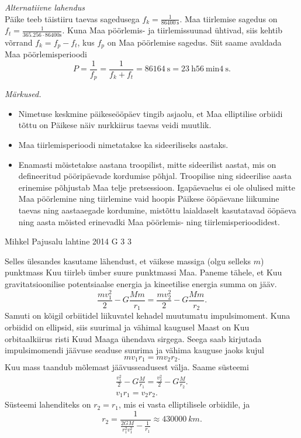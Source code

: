 \documentclass[11pt]{article}
\begin{document}
{{\vspace{0.5\baselineskip}
\emph{Alternatiivne lahendus}\\
Päike teeb täistiiru taevas sagedusega $f_k=\frac{1}{\SI{86400}{\second}}$. Maa tiirlemise sagedus on $f_t=\frac{1}{\num{365,256}\cdot86400\text{s}}$. Kuna Maa pöörlemis- ja tiirlemissuunad ühtivad, siis kehtib võrrand $f_k=f_p-f_t$, kus $f_p$ on Maa pöörlemise sagedus. Siit saame avaldada Maa pöörlemisperioodi 
\[
P=\frac{1}{f_p}=\frac{1}{f_k+f_t}=\SI{86164}{\second}=\SI{23}{\hour} \SI{56}{\minute} \SI{4}{\second}.
\]

\emph{Märkused.}

\vspace{-5pt}
\begin{itemize}[noitemsep, leftmargin=*]
\item Nimetuse keskmine päikeseööpäev tingib asjaolu, et Maa elliptilise orbiidi tõttu on Päikese näiv nurkkiirus taevas veidi muutlik.
\item Maa tiirlemisperioodi nimetatakse ka sideeriliseks aastaks. 
\item Enamasti mõistetakse aastana troopilist, mitte sideerilist aastat, mis on defineeritud pööripäevade kordumise põhjal. Troopilise ning sideerilise aasta erinemise põhjustab Maa telje pretsessioon. Igapäevaelus ei ole olulised mitte Maa pöörlemine ning tiirlemine vaid hoopis Päikese ööpäevane liikumine taevas ning aastaaegade kordumine, mistõttu laialdaselt kasutatavad ööpäeva ning aasta mõisted erinevadki Maa pöörlemis- ning tiirlemisperioodidest. 
\end{itemize}
\fi
}

{Mihkel Pajusalu} %
{lahtine} %
{2014} %
{G 3} %
{3} %
{

\ifSolution
Selles ülesandes kasutame lähendust, et väikese massiga (olgu selleks $m$) punktmass Kuu tiirleb ümber suure punktmassi Maa. Paneme tähele, et Kuu gravitatsioonilise potentsiaalse energia ja kineetilise energia summa on jääv.
$$
\frac{mv_1^2}{2}-G\frac{Mm}{r_1}=\frac{mv_2^2}{2}-G\frac{Mm}{r_2}.
$$
Samuti on kõigil orbiitidel liikuvatel kehadel muutumatu impulsimoment. Kuna orbiidid on ellipsid, siis suurimal ja vähimal kaugusel Maast on Kuu orbitaalkiirus risti Kuud Maaga ühendava sirgega. Seega saab kirjutada impulsimomendi jäävuse seaduse suurima ja vähima kauguse jaoks kujul
$$
mv_1r_1=mv_2r_2.
$$
Kuu mass taandub mõlemast jäävusseadusest välja. Saame süsteemi
$$
\begin{array}{c} 
\frac{v_1^2}{2}-G\frac{M}{r_1}=\frac{v_2^2}{2}-G\frac{M}{r_2}.\\
v_1r_1=v_2r_2.
\end{array}
$$
Süsteemi lahenditeks on $r_2=r_1$, mis ei vasta elliptilisele orbiidile, ja $$r_2=\frac{1}{\frac{2GM}{r_1^2v_1^2}-\frac{1}{r_1}}\approx\SI{430000}{km}.$$
\fi
}

}
\end{document}
